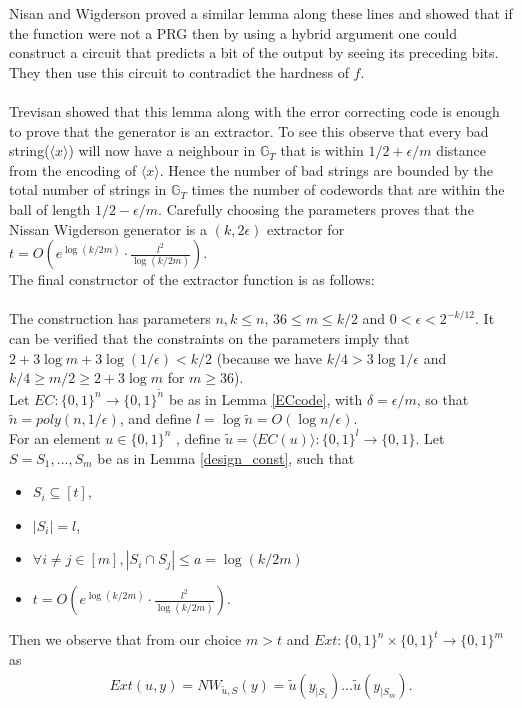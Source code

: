 Nisan and Wigderson proved a similar lemma along these lines and showed that if the function were not a PRG then by using a hybrid argument one could construct a circuit that predicts a bit of the output by seeing its preceding bits. They then use this circuit to contradict the hardness of $f$.
\\~\\
Trevisan showed that this lemma along with the error correcting code is enough to prove that the generator is an extractor. To see this observe that every bad string($\langle x \rangle$) will now have a neighbour in $\mathbb{G}_T$ that is within $1/2 + \epsilon/m$ distance from the encoding of $\langle x \rangle$. Hence the number of bad strings are bounded by the total number of strings in $\mathbb{G}_T$ times the number of codewords that are within the ball of length $1/2 - \epsilon/m$. Carefully choosing the parameters proves that the Nissan Wigderson generator is a $(k,2\epsilon)$ extractor for $t = O(e^{\log (k/2m)} \cdot \frac{l^2}{\log (k/2m)})$.
\\
The final constructor of the extractor function is as follows:
\\~\\
The construction has parameters $n, k \leq n$, $36 \leq m \leq k/2$ and $0 < \epsilon < 2^{-k/12 }$. It can be verified that the constraints on the parameters imply that $2 + 3 \log m + 3 \log (1/\epsilon) < k/2$ (because we have $k/4 > 3 \log 1/\epsilon$ and $k/4 \geq m/2 \geq 2 + 3 \log m$ for $m \geq 36$).
\\
Let $EC : \{0, 1\}^n \rightarrow \{0, 1\}^{\tilde n}$ be as in Lemma \ref{ECcode}, with $\delta = \epsilon/m$, so that $\tilde n = poly(n, 1/\epsilon)$, and define $l = \log \tilde{n} = O(\log n/\epsilon)$.
\\
For an element $u \in \{0, 1\}^n$ , define $\tilde{u} = \langle EC(u) \rangle : \{0, 1\}^l \rightarrow \{0, 1\}$. Let $S = S_1 , . . . , S_m$ be as in Lemma \ref{design_const}, such that
\begin{itemize}
	\item $S_i \subseteq [t]$,
	\item $|S_i| = l$,
	\item $\forall i \neq j \in [m], |S_i \cap S_j| \leq a = \log(k/2m)$
	\item $t = O(e^{\log (k/2m)} \cdot \frac{l^2}{\log (k/2m)})$.
\end{itemize}
Then we observe that from our choice $m > t$ and $Ext : \{0,1\}^n \times \{0,1\}^t \rightarrow \{0,1\}^m$ as
\begin{align*}
	Ext(u,y) = NW_{\tilde{u},S}(y) = \tilde{u}(y_{|S_1}) \ldots \tilde{u}(y_{|S_m}).
\end{align*}